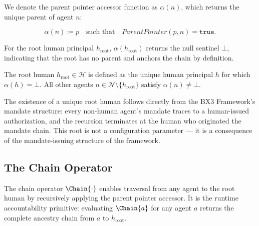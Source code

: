 We denote the parent pointer accessor function as $\alpha(n)$, which returns the unique parent of agent $n$:

\begin{equation}
\label{eq:parent-accessor}
\alpha(n) \coloneq p \quad \text{such that} \quad ParentPointer(p, n) = \texttt{true}.
\end{equation}

For the root human principal $h_{\text{root}}$, $\alpha(h_{\text{root}})$ returns the null sentinel $\bot$, indicating that the root has no parent and anchors the chain by definition.

\begin{dfn}
\label{dfn:root-human-anchor}
The root human $h_{\text{root}} \in \mathcal{H}$ is defined as the unique human principal $h$ for which $\alpha(h) = \bot$. All other agents $n \in \mathcal{N} \setminus \{h_{\text{root}}\}$ satisfy $\alpha(n) \neq \bot$.
\end{dfn}

The existence of a unique root human follows directly from the BX3 Framework's mandate structure: every non-human agent's mandate traces to a human-issued authorization, and the recursion terminates at the human who originated the mandate chain. This root is not a configuration parameter — it is a consequence of the mandate-issuing structure of the framework.

\subsection{The Chain Operator}
\label{sec:chain-operator}

The chain operator $\Chain{\cdot}$ enables traversal from any agent to the root human by recursively applying the parent pointer accessor. It is the runtime accountability primitive: evaluating $\Chain{a}$ for any agent $a$ returns the complete ancestry chain from $a$ to $h_{\text{root}}$.

